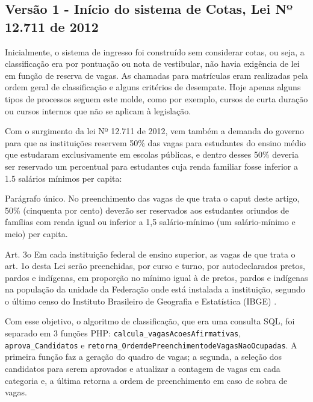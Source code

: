\subsection{Versão 1 - Início do sistema de Cotas, Lei Nº 12.711 de 2012}
\label{versao1}

Inicialmente, o sistema de ingresso foi construído sem considerar cotas, ou seja, a classificação era por pontuação ou nota de vestibular, não havia exigência de lei em função de reserva de vagas. As chamadas para matrículas eram realizadas pela ordem geral de classificação e alguns critérios de desempate. Hoje apenas alguns tipos de processos seguem este molde, como por exemplo, cursos de curta duração ou cursos internos que não se aplicam à legislação.

Com o surgimento da lei Nº 12.711 de 2012, vem também a demanda do governo para que as instituições reservem 50\% das vagas para estudantes do ensino médio que estudaram exclusivamente em escolas públicas, e dentro desses 50\% deveria ser reservado um percentual para estudantes cuja renda familiar fosse inferior a 1.5 salários mínimos per capita:

\begin{citacao}
Parágrafo único.  No preenchimento das vagas de que trata o caput deste artigo, 50\% (cinquenta por cento) deverão ser reservados aos estudantes oriundos de famílias com renda igual ou inferior a 1,5 salário-mínimo (um salário-mínimo e meio) per capita.

Art. 3o  Em cada instituição federal de ensino superior, as vagas de que trata o art. 1o desta Lei serão preenchidas, por curso e turno, por autodeclarados pretos, pardos e indígenas, em proporção no mínimo igual à de pretos, pardos e indígenas na população da unidade da Federação onde está instalada a instituição, segundo o último censo do Instituto Brasileiro de Geografia e Estatística (IBGE) \cite{leicotas}.
\end{citacao}

Com esse objetivo, o algoritmo de classificação, que era uma consulta SQL, foi separado em 3 funções PHP: \texttt{calcula\_vagasAcoesAfirmativas}, \texttt{aprova\_Candidatos} e  \texttt{retorna\_OrdemdeP}\newline\texttt{reenchimentodeVagasNaoOcupadas}.  A primeira função faz a geração do quadro de vagas; a segunda, a seleção dos candidatos para serem aprovados e atualizar a contagem de vagas em cada categoria e, a última retorna a ordem de preenchimento em caso de sobra de vagas.

